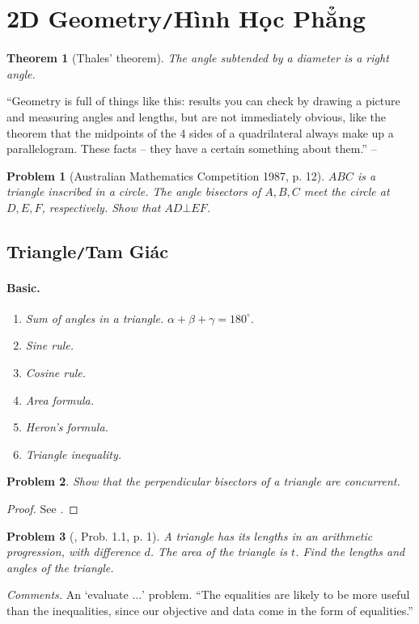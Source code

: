 \documentclass[oneside]{book}
\numberwithin{equation}{section}
\newtheorem{theorem}{Theorem}[section]
\newtheorem{problem}{Problem}[section]
\begin{document}
\section{2D Geometry\texttt{/}Hình Học Phẳng}
\begin{theorem}[Thales' theorem]
	The angle subtended by a diameter is a right angle.
\end{theorem}
``Geometry is full of things like this: results you can check by drawing a picture and measuring angles and lengths, but are not immediately obvious, like the theorem that the midpoints of the 4 sides of a quadrilateral always make up a parallelogram. These facts -- they have a certain something about them.'' -- \cite[Chap. 4, p. 50]{Tao2006}

\begin{problem}[Australian Mathematics Competition 1987, p. 12]
	$ABC$ is a triangle inscribed in a circle. The angle bisectors of $A,B,C$ meet the circle at $D,E,F$, respectively. Show that $AD\bot EF$.
\end{problem}

\subsection{Triangle\texttt{/}Tam Giác}

\paragraph{Basic.}
\begin{enumerate}
	\item \textit{Sum of angles in a triangle.} $\alpha + \beta + \gamma = 180^\circ$.
	\item \textit{Sine rule.}
	\item \textit{Cosine rule.}
	\item \textit{Area formula.}
	\item \textit{Heron's formula.}
	\item \textit{Triangle inequality.}
\end{enumerate}

\begin{problem}
	Show that the perpendicular bisectors of a triangle are concurrent.
\end{problem}

\begin{proof}[Proof]
	See \cite[p. ix]{Tao2006}.
\end{proof}

\begin{problem}[\cite{Tao2006}, Prob. 1.1, p. 1]
	A triangle has its lengths in an arithmetic progression, with difference $d$. The area of the triangle is $t$. Find the lengths and angles of the triangle.
\end{problem}
\textit{Comments.} An `evaluate $\ldots$' problem. ``The equalities are likely to be more useful than the inequalities, since our objective and data come in the form of equalities.''
\end{document}
